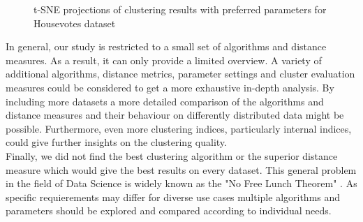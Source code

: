 
\begin{figure}[H]
	\caption{t-SNE projections of clustering results with preferred parameters for Housevotes dataset}
	\label{fig:housevotes_bestparams}
\end{figure}

In general, our study is restricted to a small set of algorithms and distance measures. As a result, it can only provide a limited overview. A variety of additional algorithms, distance metrics, parameter settings and cluster evaluation measures could be considered to get a more exhaustive in-depth analysis. By including more datasets a more detailed comparison of the algorithms and distance measures and their behaviour on differently distributed data might be possible. Furthermore, even more clustering indices, particularly internal indices, could give further insights on the clustering quality. \\

Finally, we did not find the best clustering algorithm or the superior distance measure which would give the best results on every dataset. This general problem in the field of Data Science is widely known as the "No Free Lunch Theorem" \cite{nofreelunch}. As specific requierements may differ for diverse use cases multiple algorithms and parameters should be explored and compared according to individual needs. 
